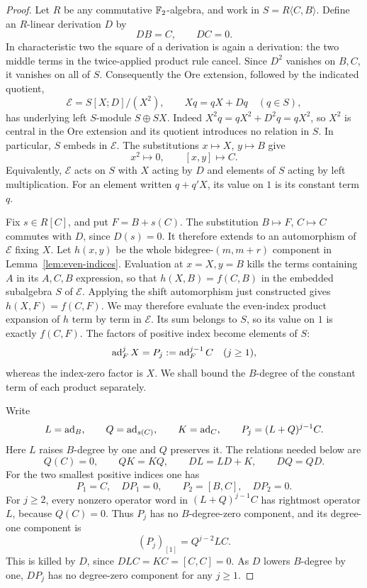 \begin{proof}
Let $R$ be any commutative ${\mathbb F_2}$-algebra, and work in
$S=R\langle C,B\rangle$.  Define an $R$-linear derivation $D$ by
\[
 DB=C,\qquad DC=0.
\]
In characteristic two the square of a derivation is again a
derivation: the two middle terms in the twice-applied product rule
cancel.  Since $D^2$ vanishes on $B,C$, it vanishes on all of $S$.
Consequently the Ore extension, followed by the indicated quotient,
\[
 \mathcal E=S[X;D]/(X^2),\qquad Xq=qX+Dq\quad(q\in S),
\]
has underlying left $S$-module $S\oplus SX$.
Indeed $X^2q=qX^2+D^2q=qX^2$, so $X^2$ is central in the Ore
extension and its quotient introduces no relation in $S$.
In particular, $S$ embeds in $\mathcal E$.
The substitutions $x\mapsto X$, $y\mapsto B$ give
\[
 x^2\mapsto0,\qquad [x,y]\mapsto C.
\]
Equivalently, $\mathcal E$ acts on $S$ with $X$ acting by $D$
and elements of $S$ acting by left multiplication.
For an element written $q+q'X$, its value on $1$ is its constant
term $q$.

Fix $s\in R[C]$, and put $F=B+s(C)$.
The substitution $B\mapsto F$, $C\mapsto C$ commutes with $D$,
since $D(s)=0$.  It therefore extends to an automorphism of
$\mathcal E$ fixing $X$.
Let $h(x,y)$ be the whole bidegree-$(m,m+r)$ component in
Lemma~\ref{lem:even-indices}.  Evaluation at $x=X,y=B$ kills the
terms containing $A$ in its $A,C,B$ expression, so that
$h(X,B)=f(C,B)$ in the embedded subalgebra $S$ of $\mathcal E$.
Applying the shift automorphism just constructed gives
$h(X,F)=f(C,F)$.  We may therefore evaluate the even-index product
expansion of $h$ term by term in $\mathcal E$.  Its sum belongs to
$S$, so its value on $1$ is exactly $f(C,F)$.
The factors of positive index become elements of $S$:
\[
 \operatorname{ad}_F^jX=P_j:=\operatorname{ad}_F^{j-1}C\quad(j\geq1),
\]
whereas the index-zero factor is $X$.
We shall bound the $B$-degree of the constant term of each product
separately.

Write
\[
 L=\operatorname{ad}_B,\qquad Q=\operatorname{ad}_{s(C)},\qquad K=\operatorname{ad}_C,
 \qquad P_j=(L+Q)^{j-1}C.
\]
Here $L$ raises $B$-degree by one and $Q$ preserves it.
The relations needed below are
\[
 Q(C)=0,\qquad QK=KQ,\qquad DL=LD+K,\qquad DQ=QD.
\]
For the two smallest positive indices one has
\begin{equation}
 \label{eq:small-indices}
 P_1=C,\quad DP_1=0,\qquad
 P_2=[B,C],\quad DP_2=0.
\end{equation}
For $j\geq2$, every nonzero operator word in $(L+Q)^{j-1}C$
has rightmost operator $L$, because $Q(C)=0$.
Thus $P_j$ has no $B$-degree-zero component, and its degree-one
component is
\[
 (P_j)_{[1]}=Q^{j-2}LC.
\]
This is killed by $D$, since $DLC=KC=[C,C]=0$.
As $D$ lowers $B$-degree by one, $DP_j$ has no degree-zero
component for any $j\geq1$.


\end{proof}
